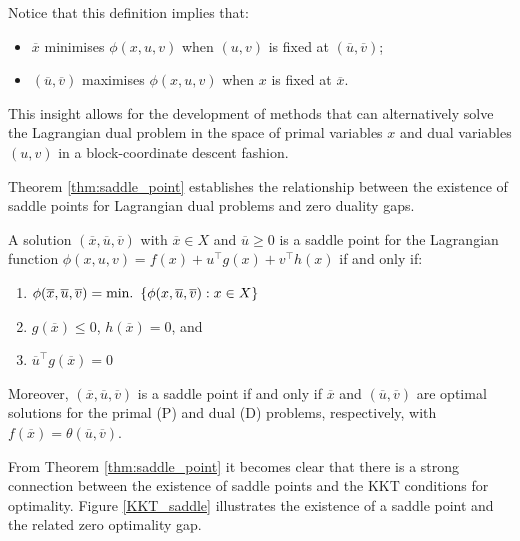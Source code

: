 Notice that this definition implies that:
\begin{itemize}
\item $\overline{x}$ minimises $\phi(x,u,v)$ when $(u,v)$ is fixed at $(\overline{u}, \overline{v})$; 
\item $(\overline{u}, \overline{v})$ maximises $\phi(x,u,v)$ when $x$ is fixed at $\overline{x}$.
\end{itemize}

This insight allows for the development of methods that can alternatively solve the Lagrangian dual problem in the space of primal variables $x$ and dual variables $(u,v)$ in a block-coordinate descent fashion. 

Theorem \ref{thm:saddle_point} establishes the relationship between the existence of saddle points for Lagrangian dual problems and zero duality gaps.

\begin{theorem} \label{thm:saddle_point}

A solution $(\overline{x}, \overline{u}, \overline{v})$ with $\overline{x} \in X$ and $\overline{u} \geq 0$ is a saddle point for the Lagrangian function $\phi(x,u,v) = f(x)  + u^\top g(x) + v^\top h(x) $ if and only if:
\begin{enumerate}
\item $\phi(\overline{x}, \overline{u}, \overline{v}) = \mathop{\text{min.~}}\left\{ \phi(x, \overline{u}, \overline{v}): x \in X \right \}$
\item $g(\overline{x}) \leq 0$, $h(\overline{x}) = 0$, and 
\item $\overline{u}^\top g(\overline{x}) = 0$
\end{enumerate}
Moreover, $(\overline{x}, \overline{u}, \overline{v})$ is a saddle point if and only if $\overline{x}$ and $(\overline{u}, \overline{v})$ are optimal solutions for the primal (P) and dual (D) problems, respectively, with $f(\overline{x}) = \theta(\overline{u}, \overline{v})$. 
\end{theorem}

From Theorem \ref{thm:saddle_point} it becomes clear that there is a strong connection between the existence of saddle points and the KKT conditions for optimality. Figure \ref{KKT_saddle} illustrates the existence of a saddle point and the related zero optimality gap.

